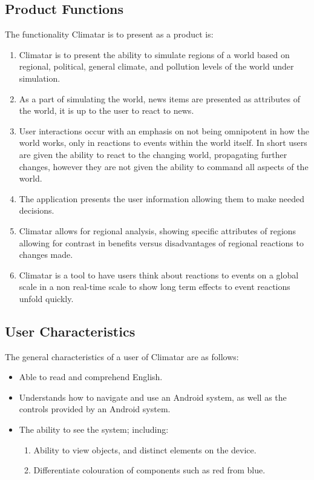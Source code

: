 \documentclass[]{article}
\begin{document}
\subsection{Product Functions}
\label{sub:product_functions}
The functionality Climatar is to present as a product is:
\begin{enumerate}
	\item Climatar is to present the ability to simulate regions of a world based on regional, political, general climate, and pollution levels of the world under simulation.
	\item As a part of simulating the world, news items are presented as attributes of the world, it is up to the user to react to news.
	\item User interactions occur with an emphasis on not being omnipotent in how the world works, only in reactions to events within the world itself. In short users are given the ability to react to the changing world, propagating further changes, however they are not given the ability to command all aspects of the world.
	\item The application presents the user information allowing them to make needed decisions.
	\item Climatar allows for regional analysis, showing specific attributes of regions allowing for contrast in benefits versus disadvantages of regional reactions to changes made.
	\item Climatar is a tool to have users think about reactions to events on a global scale in a non real-time scale to show long term effects to event reactions unfold quickly.
\end{enumerate}

\subsection{User Characteristics}
\label{sub:user_characteristics}
The general characteristics of a user of Climatar are as follows:
\begin{itemize}
	\item Able to read and comprehend English.
	\item Understands how to navigate and use an Android system, as 	well as the controls provided by an Android system.
	\item The ability to see the system; including:
	\begin{enumerate}[-]
		\item Ability to view objects, and distinct elements on the device.
		\item Differentiate colouration of components such as red from blue.
	\end{enumerate}
\end{itemize}
\end{document}
